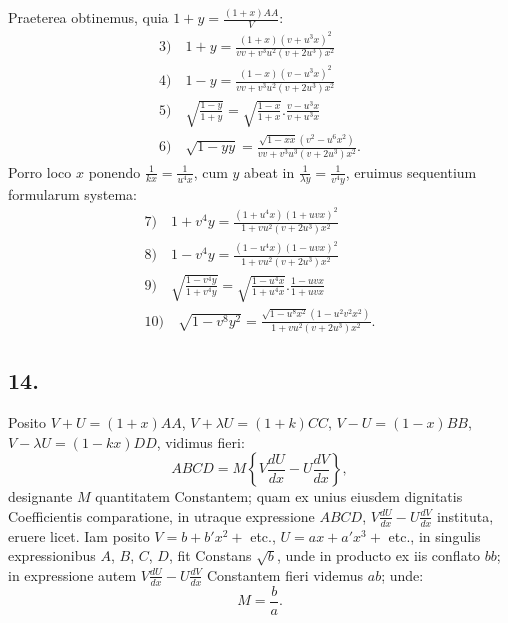 \documentclass{article}
\begin{document}
Praeterea obtinemus, quia $1+y=\frac{(1+x)AA}{V}$:
\[
\begin{gathered}
\text{3)}\quad 1+y=\frac{(1+x)(v+u^{3}x)^{2}}{vv+v^{3}u^{2}(v+2u^{3})x^{2}}\\[1.5ex]
\text{4)}\quad 1-y=\frac{(1-x)(v-u^{3}x)^{2}}{vv+v^{3}u^{2}(v+2u^{3})x^{2}}\\[1.5ex]
\text{5)}\quad \sqrt{\frac{1-y}{1+y}}=\sqrt{\frac{1-x}{1+x}}.\frac{v-u^{3}x}{v+u^{3}x}\\[1.5ex]
\text{6)}\quad \sqrt{1-yy}=\frac{\sqrt{1-xx}(v^{2}-u^{6}x^{2})}{vv+v^{3}u^{3}(v+2u^{3})x^{2}}.
\end{gathered}
\]
Porro loco $x$ ponendo $\frac{1}{kx}=\frac{1}{u^{4}x}$, cum $y$ abeat in $\frac{1}{\lambda y}=\frac{1}{v^{4}y}$, eruimus sequentium formularum systema:
\[
\begin{gathered}
\text{7)}\quad 1+v^{4}y=\frac{(1+u^{4}x)(1+uvx)^{2}}{1+vu^{2}(v+2u^{3})x^{2}}\\[1.5ex]
\text{8)}\quad 1-v^{4}y=\frac{(1-u^{4}x)(1-uvx)^{2}}{1+vu^{2}(v+2u^{3})x^{2}}\\[1.5ex]
\text{9)}\quad \sqrt{\frac{1-v^{4}y}{1+v^{4}y}}=\sqrt{\frac{1-u^{4}x}{1+u^{4}x}}.\frac{1-uvx}{1+uvx}\\[1.5ex]
\text{10)}\quad \sqrt{1-v^{8}y^{2}}=\frac{\sqrt{1-u^{8}x^{2}}(1-u^{2}v^{2}x^{2})}{1+vu^{2}(v+2u^{3})x^{2}}.
\end{gathered}
\]

\subsection*{14.}

Posito $V+U=(1+x)AA$, $V+\lambda U=(1+k)CC$, $V-U=(1-x)BB$, $V-\lambda U=(1-kx)DD$, vidimus fieri:
\[
ABCD=M\left\{V\frac{dU}{dx}-U\frac{dV}{dx}\right\},
\]
designante $M$ quantitatem Constantem; quam ex unius eiusdem dignitatis Coefficientis comparatione, in utraque expressione $ABCD$, $V\frac{dU}{dx}-U\frac{dV}{dx}$ instituta, eruere licet. Iam posito $V=b+b'x^{2}+$ etc., $U=ax+a'x^{3}+$ etc., in singulis expressionibus $A$, $B$, $C$, $D$, fit Constans $\sqrt{b}$, unde in producto ex iis conflato $bb$; in expressione autem $V\frac{dU}{dx}-U\frac{dV}{dx}$ Constantem fieri videmus $ab$; unde:
\[
M=\frac{b}{a}.
\]

\end{document}
